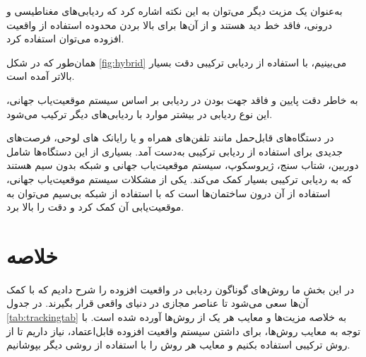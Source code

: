 به‌عنوان یک مزیت دیگر می‌توان به این نکته اشاره کرد که ردیابی‌های مغناطیسی و درونی، فاقد خط دید هستند و از آن‌ها برای بالا بردن محدوده استفاده از واقعیت افزوده می‌توان استفاده کرد. 

همان‌طور که در شکل \ref{fig:hybrid} می‌بینیم، با استفاده از ردیابی ترکیبی دقت بسیار بالاتر آمده است\cite{you1999orientation}.

به خاطر دقت پایین و فاقد جهت بودن در ردیابی بر اساس سیستم موقعیت‌یاب جهانی، این نوع ردیابی در بیشتر موارد با ردیابی‌های دیگر ترکیب می‌شود.

در دستگاه‌های قابل‌حمل مانند تلفن‌های همراه و یا رایانک های لوحی، فرصت‌های جدیدی برای استفاده از ردیابی ترکیبی به‌دست آمد. بسیاری از این دستگاه‌ها شامل دوربین، شتاب سنج، ژیروسکوپ، سیستم موقعیت‌یاب جهانی و شبکه بدون سیم هستند که به ردیابی ترکیبی بسیار کمک می‌کند. یکی از مشکلات سیستم موقعیت‌یاب جهانی، استفاده از آن درون ساختمان‌ها است که با استفاده از شبکه بی‌سیم می‌توان به موقعیت‌یابی آن کمک کرد و دقت را بالا برد\cite{duan2018augmented}.
\section{خلاصه}
در این بخش ما روش‌های گوناگون ردیابی در واقعیت افزوده را شرح دادیم که با کمک آن‌ها سعی می‌شود تا عناصر مجازی در دنیای واقعی قرار بگیرند. در جدول \ref{tab:trackingtab} به خلاصه مزیت‌ها و معایب هر یک از روش‌ها آورده شده است.
با توجه به معایب روش‌ها، برای داشتن سیستم واقعیت افزوده قابل‌اعتماد، نیاز داریم تا از روش ترکیبی استفاده بکنیم و معایب هر روش را با استفاده از روشی دیگر بپوشانیم.


